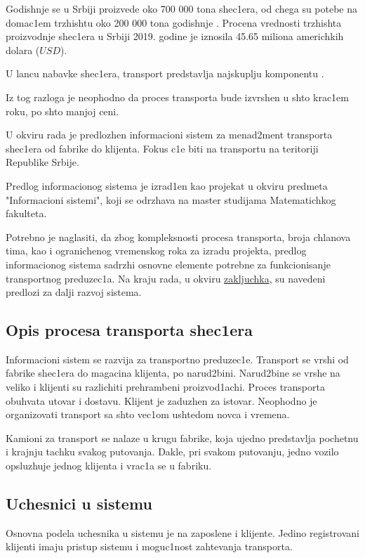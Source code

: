 
Godishnje se u Srbiji proizvede oko 700 000 tona shec1era, od chega su potebe na domac1em trzhishtu oko 200 000 tona godishnje \cite{sugar2019}. Procena vrednosti trzhishta proizvodnje shec1era u Srbiji 2019. godine je iznosila 45.65 miliona americhkih dolara ($USD$). 

U lancu nabavke shec1era, transport predstavlja najskuplju komponentu \cite{anokic2021metaheuristic}. 

Iz tog razloga je neophodno da proces transporta bude izvrshen u shto krac1em roku, po shto manjoj ceni.

U okviru rada je predlozhen informacioni sistem za menad2ment transporta shec1era od fabrike do klijenta. Fokus c1e biti na transportu na teritoriji Republike Srbije.

Predlog informacionog sistema je izrad1en kao projekat u okviru predmeta "Informacioni sistemi", koji se odrzhava na master studijama Matematichkog fakulteta.

Potrebno je naglasiti, da zbog kompleksnosti procesa transporta, broja chlanova tima, kao i ogranichenog vremenskog roka za izradu projekta, predlog informacionog sistema sadrzhi osnovne elemente potrebne za funkcionisanje transportnog preduzec1a. Na kraju rada, u okviru \hyperref[zaklj]{zakljuchka}, su navedeni predlozi za dalji razvoj sistema.


\subsection{Opis procesa transporta shec1era}

Informacioni sistem se razvija za transportno preduzec1e. Transport se vrshi od fabrike shec1era do magacina klijenta, po narud2bini.
Narud2bine se vrshe na veliko i klijenti su razlichiti prehrambeni proizvod1achi. Proces transporta obuhvata utovar i dostavu. Klijent je zaduzhen za istovar.
Neophodno je organizovati transport sa shto vec1om ushtedom novca i vremena.

Kamioni za transport se nalaze u krugu fabrike, koja ujedno predstavlja pochetnu i krajnju tachku svakog putovanja. Dakle, pri svakom putovanju, jedno vozilo opsluzhuje jednog klijenta i vrac1a se u fabriku. 


\subsection{Uchesnici u sistemu}

Osnovna podela uchesnika u sistemu je na zaposlene i klijente. Jedino registrovani klijenti imaju pristup sistemu i moguc1nost zahtevanja transporta. 

